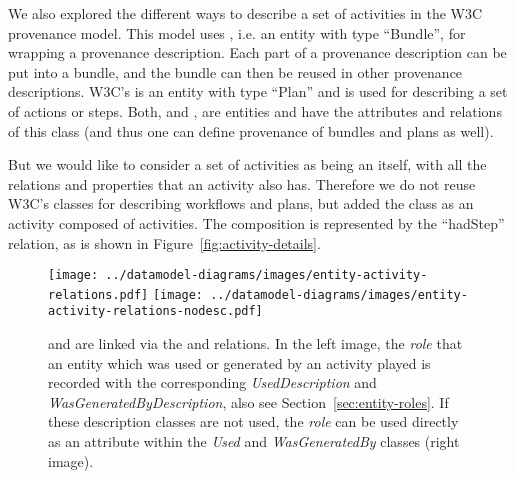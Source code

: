 We also explored the different ways to describe a set of activities in the W3C 
provenance model. This model uses , i.e. an entity with type ``Bundle'', 
for wrapping a provenance description. Each part of a provenance description can be 
put into a bundle, and the bundle can then be reused in other provenance descriptions. 
W3C's  is an entity with type ``Plan'' and is used for describing a 
set of actions or steps. Both,  and , are entities and 
have the attributes and relations of this class (and thus one can define provenance of bundles and plans as well).

But we would like to consider a set of activities as being an  itself, 
with all the relations and properties that an activity also has. Therefore we do not reuse
W3C's classes for describing workflows and plans, but added 
the class  as an activity composed of activities. The composition is represented by 
the ``hadStep'' relation, as is shown in Figure~\ref{fig:activity-details}.

%




\begin{figure}[h]
\centering
\texttt{[image: ../datamodel-diagrams/images/entity-activity-relations.pdf]}
\hspace{0.15\textwidth}
\texttt{[image: ../datamodel-diagrams/images/entity-activity-relations-nodesc.pdf]}
\caption{ and  are linked via the  and  relations. In the left image, the \emph{role} that an entity which was used or generated by an activity played is recorded with the corresponding \emph{UsedDescription} and \emph{WasGeneratedByDescription}, also see Section~\ref{sec:entity-roles}. If these description classes are not used, the \emph{role} can be used directly as an attribute within the \emph{Used} and \emph{WasGeneratedBy} classes (right image).}
\label{fig:entity-activity-relations}
\end{figure}


